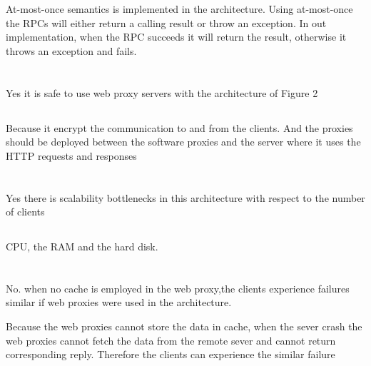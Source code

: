 \documentclass[11pt]{article}
\begin{document}
At-most-once semantics is implemented in the architecture. Using at-most-once the RPCs will either return a calling result or throw an exception. In out implementation, when the RPC succeeds it will return the result, otherwise it throws an exception and fails.

\section{}
\subsection{}
Yes it is safe to use web proxy servers with the architecture of Figure 2

\subsection{}
Because it encrypt the communication to and from the clients. And the proxies should be deployed between the software proxies and the server where it uses the HTTP requests and responses

\section{}
\subsection{}
Yes there is scalability bottlenecks in this architecture with respect to the number of clients
\subsection{}
CPU, the RAM and the hard disk.

\section{}
\subsection{}
No. when no cache is employed in the web proxy,the clients experience failures similar if web proxies were used in the architecture.

Because the web proxies cannot store the data in cache, when the sever crash the web proxies cannot fetch the data from the remote sever and cannot return corresponding reply. Therefore the clients can experience the similar failure
\end{document}
